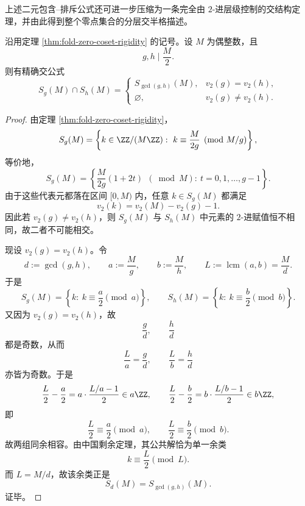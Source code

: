 上述二元包含--排斥公式还可进一步压缩为一条完全由 \(2\)-进层级控制的交结构定理，并由此得到整个零点集合的分层交半格描述。

\begin{theorem}\label{thm:xi-fold-zero-coset-v2-intersection-rigidity}
沿用定理 \ref{thm:fold-zero-coset-rigidity} 的记号。设 \(M\) 为偶整数，且
\[
g,h\mid \frac{M}{2}.
\]
则有精确交公式
\[
\boxed{\;
S_g(M)\cap S_h(M)=
\begin{cases}
S_{\gcd(g,h)}(M),& v_2(g)=v_2(h),\\[2mm]
\varnothing,& v_2(g)\neq v_2(h).
\end{cases}\;}
\]
\end{theorem}
\begin{proof}
由定理 \ref{thm:fold-zero-coset-rigidity}，
\[
S_g(M)=\left\{k\in \ZZ/(M\ZZ):\ k\equiv \frac{M}{2g}\pmod{M/g}\right\},
\]
等价地，
\[
S_g(M)=\left\{\frac{M}{2g}(1+2t)\ \ (\bmod M):\ t=0,1,\dots,g-1\right\}.
\]
由于这些代表元都落在区间 \([0,M)\) 内，任意 \(k\in S_g(M)\) 都满足
\[
v_2(k)=v_2(M)-v_2(g)-1.
\]
因此若 \(v_2(g)\neq v_2(h)\)，则 \(S_g(M)\) 与 \(S_h(M)\) 中元素的 \(2\)-进赋值恒不相同，故二者不可能相交。

现设 \(v_2(g)=v_2(h)\)。令
\[
d:=\gcd(g,h),\qquad a:=\frac{M}{g},\qquad b:=\frac{M}{h},\qquad L:=\operatorname{lcm}(a,b)=\frac{M}{d}.
\]
于是
\[
S_g(M)=\left\{k:\ k\equiv \frac{a}{2}\pmod a\right\},
\qquad
S_h(M)=\left\{k:\ k\equiv \frac{b}{2}\pmod b\right\}.
\]
又因为 \(v_2(g)=v_2(h)\)，故
\[
\frac{g}{d},\qquad \frac{h}{d}
\]
都是奇数，从而
\[
\frac{L}{a}=\frac{g}{d},
\qquad
\frac{L}{b}=\frac{h}{d}
\]
亦皆为奇数。于是
\[
\frac{L}{2}-\frac{a}{2}
=
a\cdot \frac{L/a-1}{2}\in a\ZZ,
\qquad
\frac{L}{2}-\frac{b}{2}
=
b\cdot \frac{L/b-1}{2}\in b\ZZ,
\]
即
\[
\frac{L}{2}\equiv \frac{a}{2}\pmod a,
\qquad
\frac{L}{2}\equiv \frac{b}{2}\pmod b.
\]
故两组同余相容。由中国剩余定理，其公共解恰为单一余类
\[
k\equiv \frac{L}{2}\pmod L.
\]
而 \(L=M/d\)，故该余类正是
\[
S_d(M)=S_{\gcd(g,h)}(M).
\]
证毕。
\end{proof}

